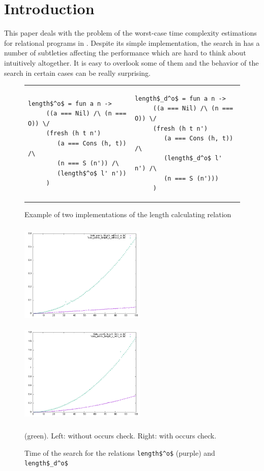 \section{Introduction}

This paper deals with the problem of the worst-case time complexity estimations for relational programs in \mK. Despite its simple implementation, the search in \mK has a number of subtleties
affecting the performance which are hard to think about intuitively altogether. It is easy to overlook some of them and the behavior of the search in certain cases can be really surprising.

\begin{figure}[t]
\begin{tabular}{p{5cm}p{5cm}}
\begin{lstlisting}[basicstyle=\small]
   length$^o$ = fun a n ->
     ((a === Nil) /\ (n === O)) \/
     (fresh (h t n')
        (a === Cons (h, t)) /\
        (n === S (n')) /\
        (length$^o$ l' n'))
     )
\end{lstlisting} &
\begin{lstlisting}[basicstyle=\small]
   length$_d^o$ = fun a n ->
     ((a === Nil) /\ (n === O)) \/
     (fresh (h t n')
        (a === Cons (h, t)) /\
        (length$_d^o$ l' n') /\
        (n === S (n')))
     )
\end{lstlisting}
\end{tabular}
\caption{Example of two implementations of the length calculating relation}
\label{fig:length_implementations}
\end{figure}

\begin{figure}[t]
    \includegraphics[width=6cm,height=5cm]{lengths_without_oc.png}
    \includegraphics[width=6cm,height=5cm]{lengths_with_oc.png}
  \caption{Time of the search for the relations \lstinline|length$^o$| (purple) and \lstinline|length$_d^o$|} (green).
  Left: without occurs check.
  Right: with occurs check.
  \label{fig:length_plots}
\end{figure}

